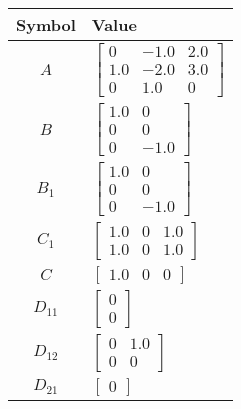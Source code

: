 \begin{tabular}{cl}
\hline
  Symbol  & Value                                                                                  \\
\hline
   $A$    & $\left[\begin{matrix}0 & -1.0 & 2.0\\1.0 & -2.0 & 3.0\\0 & 1.0 & 0\end{matrix}\right]$ \\
   $B$    & $\left[\begin{matrix}1.0 & 0\\0 & 0\\0 & -1.0\end{matrix}\right]$                      \\
 $B_{1}$  & $\left[\begin{matrix}1.0 & 0\\0 & 0\\0 & -1.0\end{matrix}\right]$                      \\
 $C_{1}$  & $\left[\begin{matrix}1.0 & 0 & 1.0\\1.0 & 0 & 1.0\end{matrix}\right]$                  \\
   $C$    & $\left[\begin{matrix}1.0 & 0 & 0\end{matrix}\right]$                                   \\
 $D_{11}$ & $\left[\begin{matrix}0\\0\end{matrix}\right]$                                          \\
 $D_{12}$ & $\left[\begin{matrix}0 & 1.0\\0 & 0\end{matrix}\right]$                                \\
 $D_{21}$ & $\left[\begin{matrix}0\end{matrix}\right]$                                             \\
\hline
\end{tabular}